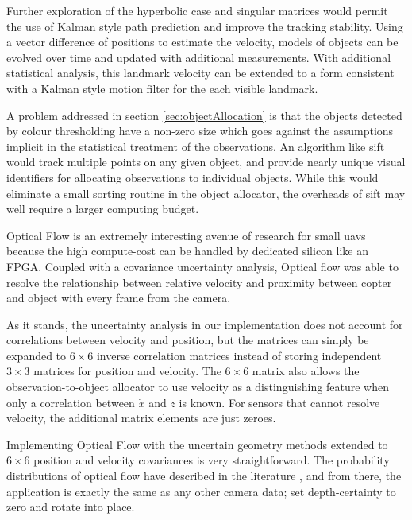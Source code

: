 \documentclass[a4paper, 11pt, titlepage]{article}
\begin{document}
  Further exploration of the hyperbolic case and singular matrices would permit the use of Kalman style path prediction and improve the tracking stability.
  Using a vector difference of positions to estimate the velocity, models of objects can be evolved over time and updated with additional measurements.  With additional statistical analysis, this landmark velocity can be extended to a form consistent with a Kalman style motion filter for the each visible landmark.

  A problem addressed in section \ref{sec:objectAllocation} is that the objects detected by colour thresholding have a non-zero size which goes against the assumptions implicit in the statistical treatment of the observations.  An algorithm like \gls{sift} would track multiple points on any given object, and provide nearly unique visual identifiers for allocating observations to individual objects.  While this would eliminate a small sorting routine in the object allocator, the overheads of \gls{sift} may well require a larger computing budget.

  Optical Flow is an extremely interesting avenue of research for small \glspl{uav} because the high compute-cost can be handled by dedicated silicon like an FPGA.  Coupled with a covariance uncertainty analysis, Optical flow was able to resolve the relationship between relative velocity and proximity between copter and object with every frame from the camera.  
  
  As it stands, the uncertainty analysis in our implementation does not account for correlations between velocity and position, but the matrices can simply be expanded to \(6\times6\) inverse correlation matrices instead of storing independent \(3\times3\) matrices for position and velocity.  The \(6\times6\) matrix also allows the observation-to-object allocator to use velocity as a distinguishing feature when only a correlation between \(\dot{x}\) and \(z\) is known.  For sensors that cannot resolve velocity, the additional matrix elements are just zeroes.

  Implementing Optical Flow with the uncertain geometry methods extended to \(6\times6\) position and velocity covariances is very straightforward. The probability distributions of optical flow have described in the literature \cite{FlowUncert}, and from there, the application is exactly the same as any other camera data; set depth-certainty to zero and rotate into place. 


\end{document}
